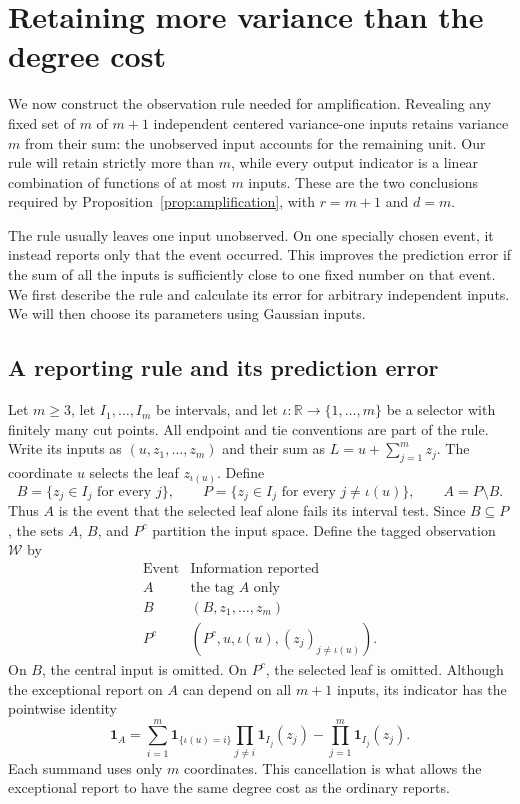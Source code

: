 \section{Retaining more variance than the degree cost}
\label{sec:observation}

We now construct the observation rule needed for amplification.  Revealing
any fixed set of $m$ of $m+1$ independent centered variance-one inputs retains variance
$m$ from their sum: the unobserved input accounts for the remaining unit.
Our rule will retain strictly more than $m$, while every output indicator
is a linear combination of functions of at most $m$ inputs.  These are
the two conclusions required by Proposition~\ref{prop:amplification},
with $r=m+1$ and $d=m$.

The rule usually leaves one input unobserved.  On one specially chosen
event, it instead reports only that the event occurred.  This improves
the prediction error if the sum of all the inputs is sufficiently close
to one fixed number on that event.  We first describe the rule and
calculate its error for arbitrary independent inputs.  We will then
choose its parameters using Gaussian inputs.

\subsection{A reporting rule and its prediction error}

Let $m\ge3$, let $I_1,\ldots,I_m$ be intervals, and let
$\iota:\mathbb R\to\{1,\ldots,m\}$ be a selector with finitely many
cut points.  All endpoint and tie conventions are part of the rule.
Write its inputs as $(u,z_1,\ldots,z_m)$ and their sum as
$L=u+\sum_{j=1}^m z_j$.  The coordinate $u$ selects the leaf
$z_{\iota(u)}$.  Define
\[
 B=\{z_j\in I_j\text{ for every }j\},\qquad
 P=\{z_j\in I_j\text{ for every }j\ne\iota(u)\},\qquad
 A=P\setminus B.
\]
Thus $A$ is the event that the selected leaf alone fails its interval
test.  Since $B\subseteq P$, the sets $A$, $B$, and $P^c$ partition
the input space.  Define the tagged observation $\mathcal W$ by
\[
\begin{array}{c|l}
 \text{Event}&\text{Information reported}\\ \hline
 A&\text{the tag }A\text{ only}\\
 B&(B,z_1,\ldots,z_m)\\
 P^c&(P^c,u,\iota(u),(z_j)_{j\ne\iota(u)}).
\end{array}
\]
On $B$, the central input is omitted.  On $P^c$, the selected leaf
is omitted.  Although the exceptional report on $A$ can depend on all
$m+1$ inputs, its indicator has the pointwise identity
\begin{equation}\label{eq:indicator}
 \mathbf1_A=
 \sum_{i=1}^m\mathbf1_{\{\iota(u)=i\}}
                  \prod_{j\ne i}\mathbf1_{I_j}(z_j)
 -\prod_{j=1}^m\mathbf1_{I_j}(z_j).
\end{equation}
Each summand uses only $m$ coordinates.  This cancellation is what
allows the exceptional report to have the same degree cost as the
ordinary reports.

